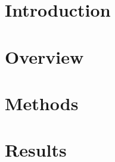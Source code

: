 \documentclass{Configuration_Files/PoliMi3i_thesis}
\begin{document}

\thispagestyle{empty}
\tableofcontents %
\thispagestyle{empty}
\cleardoublepage

%
%
%    
%

\mainmatter %

\chapter*{Introduction}



\chapter{Overview}




\chapter{Methods}


\chapter{Results}

\end{document}
